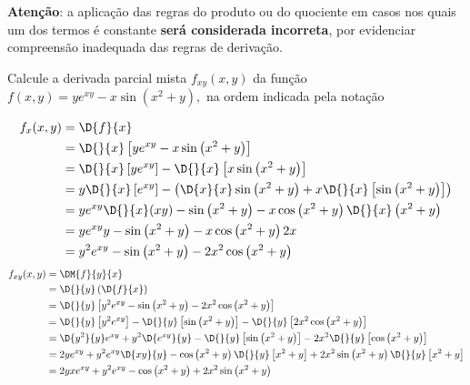 \documentclass[a4paper,12pt,fleqn]{article}
\begin{document}

\bigskip
\textbf{Atenção}: a aplicação das regras do produto ou do quociente em casos
nos quais um dos termos é constante \textbf{será considerada incorreta},
por evidenciar compreensão inadequada das regras de derivação.

Calcule a derivada parcial mista
\(
  f_{xy}(x, y)
\)
da função
\(
  f(x, y) = ye^{xy} - x\sin\left(x^2 + y\right),
\)
na ordem indicada pela notação

\begin{answer}
  \begin{align*}
    f_x(x, y)
    & = \D{f}{x} \\
    & = \D{}{x}\left[ye^{xy} - x\sin\left(x^2 + y\right)\right] \\
    & = \D{}{x}\left[ye^{xy}\right]
      - \D{}{x}\left[x\sin\left(x^2 + y\right)\right] \\
    & = y\D{}{x}\left[e^{xy}\right] -
        \left(
          \D{x}{x}\sin\left(x^2 + y\right)
        + x\D{}{x}\left[\sin\left(x^2 + y\right)\right]
        \right)
    \\
    & = ye^{xy}\D{}{x}(xy)
      - \sin\left(x^2 + y\right)
      - x\cos\left(x^2 + y\right)\D{}{x}\left(x^2 + y\right)
    \\
    & = ye^{xy}y
      - \sin\left(x^2 + y\right)
      - x\cos\left(x^2 + y\right)2x
    \\
    & = y^2e^{xy}
      - \sin\left(x^2 + y\right)
      - 2x^2\cos\left(x^2 + y\right)
  \end{align*}
  \begin{align*}
    f_{xy}(x, y)
    & = \DM{f}{y}{x} \\
    & = \D{}{y}\left(\D{f}{x}\right)
    \\
    & = \D{}{y}\left[
          y^2e^{xy}
          - \sin\left(x^2 + y\right)
          - 2x^2\cos\left(x^2 + y\right)
        \right]
    \\
    & = \D{}{y}\left[ y^2e^{xy} \right]
      - \D{}{y}\left[ \sin\left(x^2 + y\right) \right]
      - \D{}{y}\left[ 2x^2\cos\left(x^2 + y\right) \right]
    \\
    & = \D{y^2}{y}e^{xy} + y^2\D{e^{xy}}{y}
      - \D{}{y}\left[ \sin\left(x^2 + y\right) \right]
      - 2x^2\D{}{y}\left[ \cos\left(x^2 + y\right) \right]
    \\
    & = 2ye^{xy} + y^2e^{xy}\D{xy}{y}
      - \cos\left(x^2 + y\right) \D{}{y}\left[ x^2 + y \right]
      + 2x^2\sin\left(x^2 + y\right)\D{}{y}\left[ x^2 + y \right]
    \\
    & = 2yxe^{xy} + y^2e^{xy}
      - \cos\left(x^2 + y\right)
      + 2x^2\sin\left(x^2 + y\right)
  \end{align*}
\end{answer}
\end{document}
